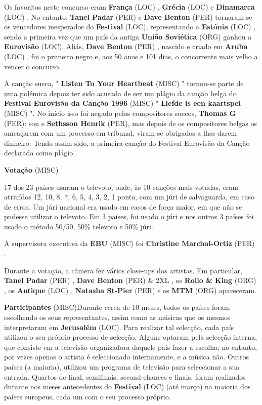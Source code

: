 \documentclass[12pt,a4paper]{article}
\begin{document}
Os favoritos neste concurso eram \textbf{França} (LOC) , \textbf{Grécia} (LOC) e \textbf{Dinamarca} (LOC) . No entanto, \textbf{Tanel Padar} (PER) e \textbf{Dave Benton} (PER) tornaram-se os vencedores inesperados do \textbf{Festival} (LOC), representando a \textbf{Estónia} (LOC) , sendo a primeira vez que um país da antiga \textbf{União Soviética} (ORG) ganhou a \textbf{Eurovisão} (LOC). Aliás, \textbf{Dave Benton} (PER) , nascido e criado em \textbf{Aruba} (LOC) , foi o primeiro negro e, aos 50 anos e 101 dias, o concorrente mais velho a vencer o concurso.

A canção sueca, " \textbf{Listen To Your Heartbeat} (MISC) " tornou-se parte de uma polémica depois ter sido acusada de ser um plágio da canção belga do \textbf{Festival Eurovisão da Canção 1996} (MISC) " \textbf{Liefde is een kaartspel} (MISC) ". No início isso foi negado pelos compositores suecos, \textbf{Thomas G} (PER): son e \textbf{Sethsson Henrik} (PER), mas depois de os compositores belgas os ameaçarem com um processo em tribunal, viram-se obrigados a lhes darem dinheiro. Tendo assim sido, a primeira canção do Festival Eurovisão da Canção declarada como plágio .



\textbf{Votação} (MISC)

17 dos 23 países usaram o televoto, onde, às 10 canções mais votadas, eram atriuídos 12, 10, 8, 7, 6, 5, 4, 3, 2, 1 ponto, com um júri de salvaguarda, em caso de erros. Um júri nacional era usado em casos de força maior, em que não se pudesse utilizar o televoto. Em 3 países, foi usado o júri e nos outros 3 países foi usado o método 50/50, 50\% televoto e 50\% júri.

A supervisora executiva da \textbf{EBU} (MISC) foi \textbf{Christine Marchal-Ortiz} (PER) .

Durante a votação, a câmera fez vários close-ups dos artistas. Em particular, \textbf{Tanel Padar} (PER) , \textbf{Dave Benton} (PER) \& 2XL , os \textbf{Rollo \& King} (ORG) , os \textbf{Antique} (LOC) , \textbf{Natasha St-Pier} (PER) e os \textbf{MTM} (ORG) apareceram.



\textbf{Participantes} (MISC)Durante cerca de 10 meses, todos os países foram escolhendo os seus representantes, assim como as músicas que os mesmos interpretaram em \textbf{Jerusalém} (LOC). Para realizar tal selecção, cada país utilizou o seu próprio processo de selecção. Alguns optaram pela selecção interna, que consiste em a televisão organizadora daquele país fazer a escolha; no entanto, por vezes apenas o artista é seleccionado internamente, e a música não. Outros países (a maioria), utilizou um programa de televisão para seleccionar a sua entrada. Quartos de final, semifinais, second-chances e finais, foram realizados durante nos meses antecedentes do \textbf{Festival} (LOC) (até março) na maioria dos países europeus, cada um com o seu processo próprio.
\end{document}
